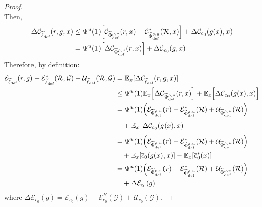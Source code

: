 \begin{appendices}
\begin{proof}
\begin{equation}
\end{equation}
Then,
\begin{equation}
    \begin{aligned}
        \Delta\mathcal{C}_{\widetilde{\ell}_{\text{def}}}(r,g,x) & \leq \Psi^u(1) \Big[\mathcal{C}_{\widetilde{\Phi}^{\rho, u}_{\text{def}}}(r,x) - \mathcal{C}_{\widetilde{\Phi}^{\rho, u}_{\text{def}}}^\ast(\mathcal{R},x)\Big] + \Delta\mathcal{C}_{c_0}(g(x),x) \\
        & = \Psi^u(1) \Big[\Delta\mathcal{C}_{\widetilde{\Phi}^{\rho, u}_{\text{def}}}(r,x) \Big] + \Delta\mathcal{C}_{c_0}(g,x) \\
    \end{aligned}
\end{equation}
Therefore, by definition:
\begin{equation}\label{eq:proof}
    \begin{aligned}
        \mathcal{E}_{\widetilde{\ell}_{\text{def}}}(r,g)  - \mathcal{E}^*_{\widetilde{\ell}_{\text{def}}}(\mathcal{R}, \mathcal{G}) + \mathcal{U}_{\widetilde{\ell}_{\text{def}}}(\mathcal{R}, \mathcal{G}) & = \mathbb{E}_x[\Delta\mathcal{C}_{\widetilde{\ell}_{\text{def}}}(r,g,x)] \\
        & \leq \Psi^u(1) \mathbb{E}_x\Big[\Delta\mathcal{C}_{\widetilde{\Phi}^{\rho, u}_{\text{def}}}(r,x) \Big] + \mathbb{E}_x\Big[\Delta\mathcal{C}_{c_0}(g(x),x)\Big] \\
        & = \Psi^u(1)\Big(\mathcal{E}_{\widetilde{\Phi}^{\rho, u}_{\text{def}}}(r) - \mathcal{E}^*_{\widetilde{\Phi}^{\rho, u}_{\text{def}}}(\mathcal{R}) + \mathcal{U}_{\widetilde{\Phi}^{\rho, u}_{\text{def}}}(\mathcal{R})\Big) \\
        & \quad + \mathbb{E}_x\Big[\Delta\mathcal{C}_{c_0}(g(x),x)\Big] \\
        & = \Psi^u(1)\Big(\mathcal{E}_{\widetilde{\Phi}^{\rho, u}_{\text{def}}}(r) - \mathcal{E}^*_{\widetilde{\Phi}^{\rho, u}_{\text{def}}}(\mathcal{R}) + \mathcal{U}_{\widetilde{\Phi}^{\rho, u}_{\text{def}}}(\mathcal{R})\Big) \\
        & \quad + \mathbb{E}_x[\overline{c}_0(g(x),x)] - \mathbb{E}_x[\overline{c}^\ast_0(x)] \\
        & = \Psi^u(1)\Big(\mathcal{E}_{\widetilde{\Phi}^{\rho, u}_{\text{def}}}(r) - \mathcal{E}^*_{\widetilde{\Phi}^{\rho, u}_{\text{def}}}(\mathcal{R}) + \mathcal{U}_{\widetilde{\Phi}^{\rho, u}_{\text{def}}}(\mathcal{R})\Big) \\
        & \quad + \Delta\mathcal{E}_{c_0}(g)
    \end{aligned}
\end{equation}
where \( \Delta\mathcal{E}_{c_0}(g) = \mathcal{E}_{c_0}(g) - \mathcal{E}_{c_0}^B(\mathcal{G}) + \mathcal{U}_{c_0}(\mathcal{G}) \).


\end{proof}
\end{appendices}
